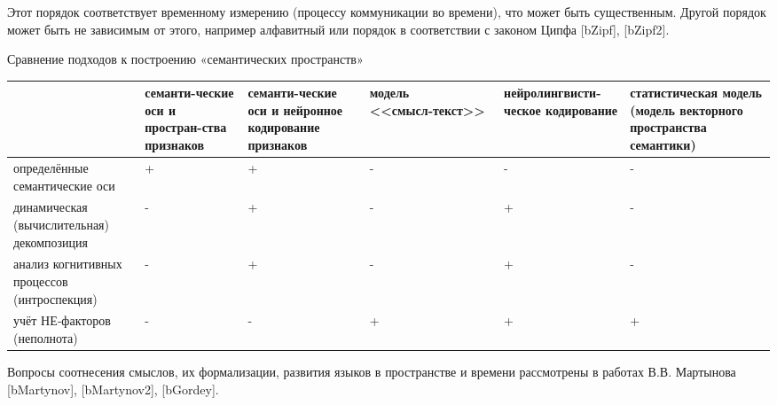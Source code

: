 Этот порядок соответствует временному измерению (процессу коммуникации во времени), что может быть существенным. Другой порядок может быть не зависимым от этого, например алфавитный или порядок в соответствии с законом Ципфа [bZipf], [bZipf2]. 

Сравнение подходов к построению «семантических пространств»

\begin{tabular}{|>{\centering\arraybackslash}m{3cm}|>{\centering\arraybackslash}m{2cm}|>{\centering\arraybackslash}m{2cm}|>{\centering\arraybackslash}m{3cm}|>{\centering\arraybackslash}m{3cm}|>{\centering\arraybackslash}m{3cm}|}
	\hline
& семанти-ческие оси и простран-ства признаков
& семанти-ческие оси и нейронное кодирование признаков
& модель <<смысл‑текст>>
& нейролингвисти-ческое кодирование
& статистическая модель (модель векторного пространства семантики)
\\
	\hline
	определённые семантические оси
	& +
	& +
	& -
	& -
	& -
	\\
	\hline
	динамическая (вычислительная) декомпозиция
	& -
	& +
	& -
	& +
	& -
	\\
	\hline
анализ когнитивных процессов (интроспекция)
 & -
 & +
 & -
 & +
 & -
 \\
	\hline
учёт НЕ‑факторов (неполнота)
 & -
 & -
 & +
 & +
 & +
 \\
	\hline
\end{tabular}






Вопросы соотнесения смыслов, их формализации, развития языков в пространстве и времени рассмотрены в работах В.В. Мартынова [bMartynov], [bMartynov2], [bGordey].

%